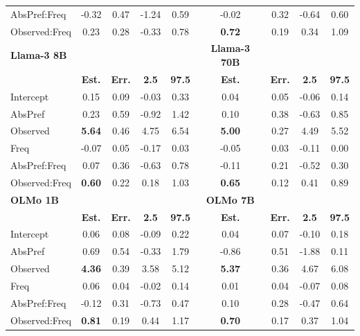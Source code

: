 \documentclass[
  12pt,
  letterpaper,
]{scrreprt}
\begin{document}
\begin{table}
{\begin{tabular}{l|cccc|cccc}
         AbsPref:Freq & -0.32 & 0.47 & -1.24 & 0.59 & -0.02 & 0.32 & -0.64 & 0.60 \\
         Observed:Freq & 0.23 & 0.28 & -0.33 & 0.78 & \textbf{0.72} & 0.19 & 0.34 & 1.09  \\
         \hline
         \textbf{Llama-3 8B} & & & & & \textbf{Llama-3 70B}\\
        \hline
         & \textbf{Est.} & \textbf{Err.} & \textbf{2.5} & \textbf{97.5} & \textbf{Est.} & \textbf{Err.} & \textbf{2.5} & \textbf{97.5} \\
         \hline
         Intercept & 0.15 & 0.09 & -0.03 & 0.33 & 0.04 & 0.05 & -0.06 & 0.14 \\
         AbsPref & 0.23 & 0.59 & -0.92 & 1.42 & 0.10 & 0.38 & -0.63 & 0.85  \\
         Observed & \textbf{5.64} & 0.46 & 4.75 & 6.54 & \textbf{5.00} & 0.27 & 4.49 & 5.52 \\
         Freq & -0.07 & 0.05 & -0.17 & 0.03 & -0.05 & 0.03 & -0.11 & 0.00  \\
         AbsPref:Freq & 0.07 & 0.36 & -0.63 & 0.78 & -0.11 & 0.21 & -0.52 & 0.30 \\
         Observed:Freq & \textbf{0.60} & 0.22 & 0.18 & 1.03 & \textbf{0.65} & 0.12 & 0.41 & 0.89 \\
         \hline
          \textbf{OLMo 1B} & & & & & \textbf{OLMo 7B}\\
        \hline
         & \textbf{Est.} & \textbf{Err.} & \textbf{2.5} & \textbf{97.5} & \textbf{Est.} & \textbf{Err.} & \textbf{2.5} & \textbf{97.5} \\
         \hline
         Intercept & 0.06 & 0.08 & -0.09 & 0.22 & 0.04 & 0.07 & -0.10 & 0.18 \\
         AbsPref & 0.69 & 0.54 & -0.33 & 1.79 & -0.86 & 0.51 & -1.88 & 0.11\\
         Observed & \textbf{4.36} & 0.39 & 3.58 & 5.12 & \textbf{5.37} & 0.36 & 4.67 & 6.08 \\
         Freq & 0.06 & 0.04 & -0.02 & 0.14 & 0.01 & 0.04 & -0.07 & 0.08 \\
         AbsPref:Freq & -0.12 & 0.31 & -0.73 & 0.47 & 0.10 & 0.28 & -0.47 & 0.64 \\
         Observed:Freq & \textbf{0.81} & 0.19 & 0.44 & 1.17 & \textbf{0.70} & 0.17 & 0.37 & 1.04  \\
         \hline
    \end{tabular}

}

\end{table}%
\end{document}

